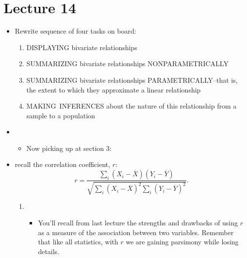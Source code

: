 \documentclass[11pt]{article}
\begin{document}
\section{Lecture 14}

\begin{itemize}
\item Rewrite sequence of four tasks on board:

\begin{enumerate}
\item DISPLAYING bivariate relationships

\item SUMMARIZING bivariate relationships NONPARAMETRICALLY

\item SUMMARIZING bivariate relationships PARAMETRICALLY--that is, the
extent to which they approximate a linear relationship

\item MAKING\ INFERENCES about the nature of this relationship from a sample
to a population
\end{enumerate}

\item 
\begin{itemize}
\item Now picking up at section 3:
\end{itemize}

\item recall the correlation coefficient, $r:$%
\begin{equation*}
r=\frac{\sum\nolimits_{i}\left( X_{i}-\overline{X}\right) \left( Y_{i}-%
\overline{Y}\right) }{\sqrt{\sum\nolimits_{i}\left( X_{i}-\overline{X}%
\right) ^{2}\sum\nolimits_{i}\left( Y_{i}-\overline{Y}\right) ^{2}}}.
\end{equation*}

\begin{enumerate}
\item 
\begin{itemize}
\item You'll recall from last lecture the strengths and drawbacks of using $%
r $ as a measure of the association between two variables. Remember that
like all statistics, with $r$ we are gaining parsimony while losing
details.\ 
\end{itemize}
\end{enumerate}


\end{itemize}
\end{document}
